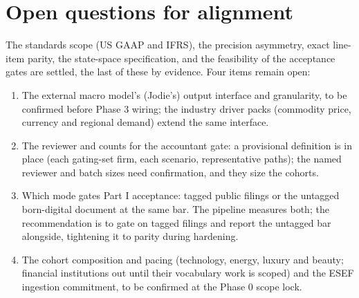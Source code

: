 \documentclass[11pt]{article}
\begin{document}
\section{Open questions for alignment}
The standards scope (US GAAP and IFRS), the precision asymmetry, exact line-item parity, the state-space specification, and the feasibility of the acceptance gates are settled, the last of these by evidence. Four items remain open:
\begin{enumerate}
  \item The external macro model's (Jodie's) output interface and granularity, to be confirmed before Phase 3 wiring; the industry driver packs (commodity price, currency and regional demand) extend the same interface.
  \item The reviewer and counts for the accountant gate: a provisional definition is in place (each gating-set firm, each scenario, representative paths); the named reviewer and batch sizes need confirmation, and they size the cohorts.
  \item Which mode gates Part I acceptance: tagged public filings or the untagged born-digital document at the same bar. The pipeline measures both; the recommendation is to gate on tagged filings and report the untagged bar alongside, tightening it to parity during hardening.
  \item The cohort composition and pacing (technology, energy, luxury and beauty; financial institutions out until their vocabulary work is scoped) and the ESEF ingestion commitment, to be confirmed at the Phase 0 scope lock.
\end{enumerate}

\clearpage
\appendix
\end{document}
